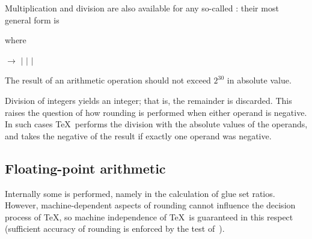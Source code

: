 \documentclass[twoside,letterpaper,openright]{rapport3}
\begin{document}
Multiplication and division are also available for any so-called
: their most general form is
\begin{disp}
\end{disp} where
\begin{disp} $\longrightarrow$
 $|$ \nl
\indent $|$  $|$ \end{disp}

The result of an arithmetic operation should not exceed
$2^{30}$ in absolute value.

Division of integers yields an integer; that is, the remainder
is discarded. This raises the question of how rounding is performed
when either operand is negative. In such cases \TeX\ performs
the division with the absolute values of the operands, and
takes the negative of the result if exactly one operand was negative.

\subsection{Floating-point arithmetic}

Internally some 
is performed, namely
in the calculation of glue set ratios.
However, machine-dependent aspects of rounding cannot
influence the decision process of \TeX, so machine independence
of \TeX\ is guaranteed in this respect (sufficient
accuracy of rounding is enforced by the  test of~\cite{K:trip}).
\end{document}
